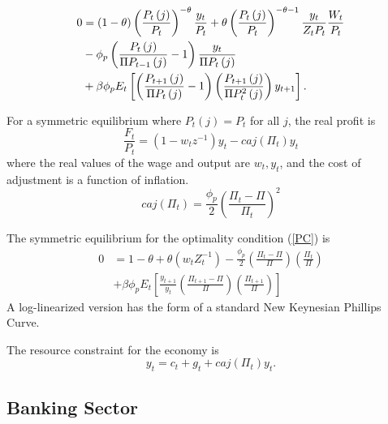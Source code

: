 \documentclass[]{article}
\begin{document}
\begin{equation} \label{PC}
\begin{split}
0 &=\left( 1-\theta \right) \left( \frac{P_{t}\left( j\right) }{P_{t}}%
\right) ^{-\theta }\frac{y_{t}}{P_{t}}+\theta \left( \frac{P_{t}\left(
j\right) }{P_{t}}\right) ^{-\theta -1}\frac{y_{t}}{Z_{t}P_{t}}\frac{W_{t}}{%
P_{t}} \\
&-\phi _{p}\left( \frac{P_{t}\left( j\right) }{\Pi
P_{t-1}\left( j\right) }-1\right) \frac{y_{t}}{\Pi
P_{t}\left( j\right) } \\
&+\beta \phi _{p}E_{t}\left[ \left( \frac{P_{t+1}\left( j\right) }{\Pi P_{t}\left( j\right) }-1\right) \left( \frac{P_{t+1}\left(
j\right) }{\Pi P_{t}^{2}\left( j\right) }\right) y_{t+1}%
\right] .
\end{split}
\end{equation}

For a symmetric equilibrium where $P_{t}(j)=P_{t}$ for all $j$, the real profit is
\begin{equation} \label{real profit sym}
\frac{F_{t}}{P_{t}}=\left(1-w_{t}z^{-1}\right)y_{t}-caj(\Pi_{t})y_{t}
\end{equation}
where the real values of the wage and output are $w_{t},y_{t}$, and the cost of adjustment is a function of inflation.
\[
caj(\Pi_{t})=\frac{\phi_{p}}{2}\left(\frac{\Pi_{t}-\Pi}{\Pi_{t}}\right)^{2}
\]

The symmetric equilibrium for the optimality condition (\ref{PC}) is
\begin{equation} \label{PCsym}
\begin{split}
0 &=1-\theta+\theta(w_{t}Z_{t}^{-1})-\frac{\phi_{p}}{2}\left(\frac{\Pi_{t}-\Pi}{\Pi}\right)\left(\frac{\Pi_{t}}{\Pi}\right) \\
&+\beta\phi_{p}E_{t}\left[\frac{y_{t+1}}{y_{t}}\left(\frac{\Pi_{t+1}-\Pi}{\Pi}\right)\left(\frac{\Pi_{t+1}}
{\Pi}\right)\right]
\end{split}
\end{equation}
A log-linearized version has the form of a standard New Keynesian
Phillips Curve.

The resource constraint for the economy is
\begin{equation} \label{ycg}
    y_{t}=c_{t}+g_{t}+caj(\Pi_{t})y_{t}.
\end{equation}

\subsection{Banking Sector}
\end{document}
